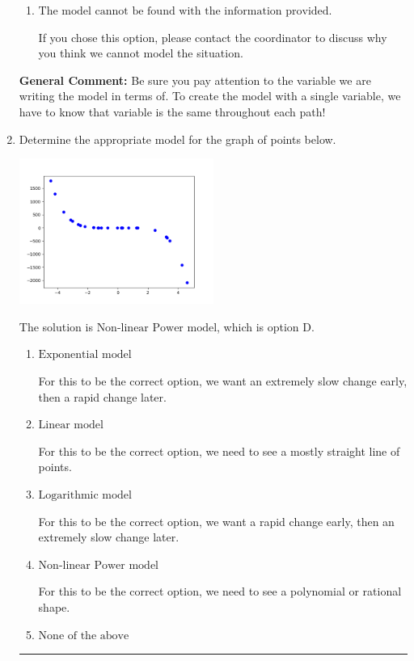 \documentclass{extbook}[14pt]
\newcommand{\litem}[1]{\item #1

\rule{\textwidth}{0.4pt}}
\begin{document}
\begin{enumerate}
{\begin{enumerate}[label=\Alph*.]
Since we know all parts of the path are equal length, we can treat all distance variables as the same variable, $D$.
\item \( \text{The model cannot be found with the information provided.} \)

If you chose this option, please contact the coordinator to discuss why you think we cannot model the situation.
\end{enumerate}

\textbf{General Comment:} Be sure you pay attention to the variable we are writing the model in terms of. To create the model with a single variable, we have to know that variable is the same throughout each path!
}
\litem{
Determine the appropriate model for the graph of points below.

\begin{center}
    \includegraphics[width=0.5\textwidth]{../Figures/identifyModelGraph12A.png}
\end{center}


The solution is \( \text{Non-linear Power model} \), which is option D.\begin{enumerate}[label=\Alph*.]
\item \( \text{Exponential model} \)

For this to be the correct option, we want an extremely slow change early, then a rapid change later.
\item \( \text{Linear model} \)

For this to be the correct option, we need to see a mostly straight line of points.
\item \( \text{Logarithmic model} \)

For this to be the correct option, we want a rapid change early, then an extremely slow change later.
\item \( \text{Non-linear Power model} \)

For this to be the correct option, we need to see a polynomial or rational shape.
\item \( \text{None of the above} \)


\end{enumerate}}
\end{enumerate}
\end{document}

